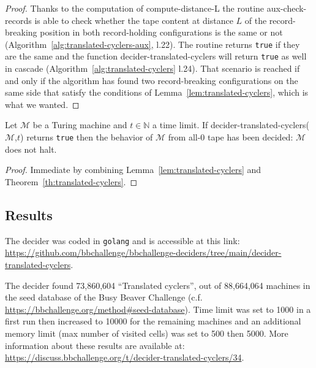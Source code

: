 \begin{proof}
  Thanks to the computation of {\sc compute-distance-L} the routine {\sc aux-check-records} is able to check whether the tape content at distance $L$ of the record-breaking position in both record-holding configurations is the same or not (Algorithm~\ref{alg:translated-cyclers-aux}, l.22). The routine returns \texttt{true} if they are the same and the function {\sc decider-translated-cyclers} will return \texttt{true} as well in cascade (Algorithm~\ref{alg:translated-cyclers} l.24). That scenario is reached if and only if the algorithm has found two record-breaking configurations on the same side that satisfy the conditions of Lemma~\ref{lem:translated-cyclers}, which is what we wanted.

\end{proof}

\begin{corollary}
  Let $\mathcal{M}$ be a Turing machine and $t \in \mathbb{N}$ a time limit. If {\sc decider-translated-cyclers}($\mathcal{M}$,$t$) returns \texttt{true} then the behavior of $\mathcal{M}$ from all-0 tape has been decided: $\mathcal{M}$ does not halt.
\end{corollary}
\begin{proof}
  Immediate by combining Lemma~\ref{lem:translated-cyclers} and Theorem~\ref{th:translated-cyclers}.
\end{proof}

\subsection{Results}

The decider was coded in \texttt{golang} and is accessible at this link: \url{https://github.com/bbchallenge/bbchallenge-deciders/tree/main/decider-translated-cyclers}.

The decider found 73,860,604 ``Translated cyclers'', out of 88,664,064 machines in the seed database of the Busy Beaver Challenge (c.f. \url{https://bbchallenge.org/method#seed-database}). Time limit was set to 1000 in a first run then increased to 10000 for the remaining machines and an additional memory limit (max number of visited cells) was set to 500 then 5000. More information about these results are available at: \url{https://discuss.bbchallenge.org/t/decider-translated-cyclers/34}.
